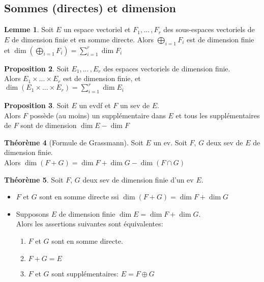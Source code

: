 \documentclass[10pt,a4paper]{article}
\theoremstyle{definition}
\newtheorem{proposition}{Proposition}[section]
\newtheorem{theorem}[proposition]{Théorème}
\newtheorem{lemme}[proposition]{Lemme}
\begin{document}
\subsection{Sommes (directes) et dimension}
\begin{lemme}
Soit $E$ un espace vectoriel et $F_1, ...\, , F_r$ des sous-espaces vectoriels de $E$ de dimension finie et en somme directe. Alors $\bigoplus\limits_{i = 1} F_i$ est de dimension finie et $\dim (\bigoplus\limits_{i = 1} F_i) = \sum\limits_{i = 1}^{r} \dim F_i$
\end{lemme}
\begin{proposition}
Soit $E_1, ...\, , E_r$ des espaces vectoriels de dimension finie. \\
Alors $E_1 \times ... \times E_r$ est de dimension finie, et $\dim (E_1 \times ... \times E_r) = \sum\limits_{i = 1}^{r} \dim E_i$
\end{proposition}
\begin{proposition}
Soit $E$ un evdf et $F$ un sev de $E$. \\
Alors $F$ possède (au moins) un supplémentaire dans $E$ et tous les supplémentaires de $F$ sont de dimension $\dim E - \dim F$
\end{proposition}
\begin{theorem}[Formule de Grassmann]
Soit $E$ un ev. Soit $F$, $G$ deux sev de $E$ de dimension finie. \\
Alors $\dim (F + G) = \dim F + \dim G - \dim (F \cap G)$
\end{theorem}
\begin{theorem}
Soit $F$, $G$ deux sev de dimension finie d'un ev $E$.
\begin{itemize}
\item $F$ et $G$ sont en somme directe ssi $\dim (F + G) = \dim F + \dim G$
\item Supposons $E$ de dimension finie $\dim E = \dim F + \dim G$. \\
Alors les assertions suivantes sont équivalentes:
\begin{enumerate}
\item $F$ et $G$ sont en somme directe.
\item $F + G = E$
\item $F$ et $G$ sont supplémentaires: $E = F \oplus G$
\end{enumerate}
\end{itemize}
\end{theorem}
\end{document}

